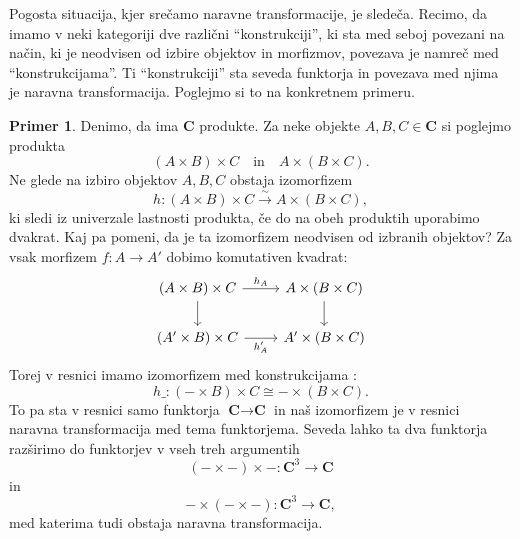 \documentclass[12pt,a4paper]{book}
\theoremstyle{definition}
\theoremstyle{plain}
\theoremstyle{definition}
\newtheorem{primer}{Primer}[section]
\theoremstyle{remark}
\newcommand{\cat}[1]{\textbf{#1}}
\begin{document}
Pogosta situacija, kjer srečamo naravne transformacije, je sledeča. Recimo, da imamo v neki kategoriji dve različni "`konstrukciji"', ki sta med seboj povezani na način, ki je neodvisen od izbire objektov in morfizmov, povezava je namreč med "`konstrukcijama"'. Ti "`konstrukciji"' sta seveda funktorja in povezava med njima je naravna transformacija. Poglejmo si to na konkretnem primeru.

\begin{primer}
Denimo, da ima $\cat{C}$ produkte. Za neke objekte $A,B,C \in \cat{C}$ si poglejmo produkta
$$(A \times B) \times C \quad \text{in} \quad A \times (B \times C).$$
Ne glede na izbiro objektov $A,B,C$ obstaja izomorfizem
$$h : (A \times B) \times C \xrightarrow{\sim} A \times (B \times C),$$
ki sledi iz univerzale lastnosti produkta, če do na obeh produktih uporabimo dvakrat.
Kaj pa pomeni, da je ta izomorfizem neodvisen od izbranih objektov? Za vsak morfizem $f : A \to A'$ dobimo komutativen kvadrat:
%
$$ \begin{tikzcd}
(A \times B) \times C \ar[r, "h_A"] \ar[d] & A \times (B \times C) \ar[d] \\
(A' \times B) \times C \ar[r, "h_A'"'] & A' \times (B \times C) 
\end{tikzcd} $$
Torej v resnici imamo izomorfizem med konstrukcijama :
$$h\_ : (- \times B) \times C \cong - \times (B \times C).$$
To pa sta v resnici samo funktorja $\cat{C} \to \cat{C}$ in naš izomorfizem je v resnici naravna transformacija med tema funktorjema. Seveda lahko ta dva funktorja razširimo do funktorjev v vseh treh argumentih
$$(- \times -) \times - : \cat{C}^3 \to \cat{C}$$
in
$$ - \times (- \times -) : \cat{C}^3 \to \cat{C},$$
med katerima tudi obstaja naravna transformacija.
\end{primer}
\end{document}
